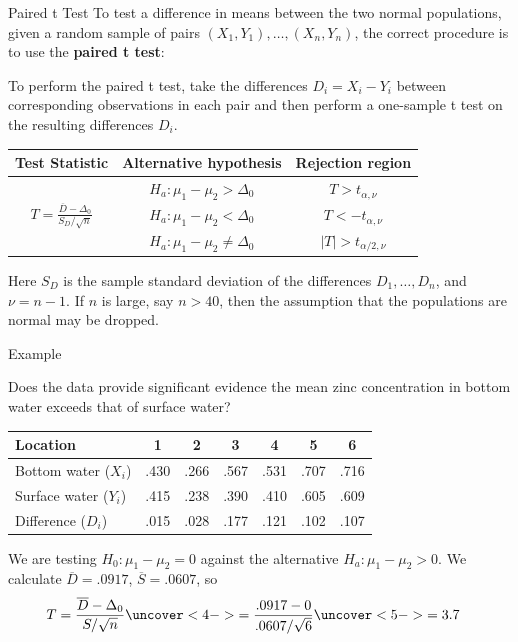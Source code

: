 \documentclass[handout]{beamer}
\renewcommand{\emph}{\textbf}
\begin{document}
\begin{frame}{Paired t Test}
To test a difference in means between the two normal populations, given a random sample of pairs $(X_1,Y_1), \dots, (X_n,Y_n)$, the correct procedure is to use the \emph{paired t test}:

\pause \vspace{.2cm}
To perform the paired t test, take the differences $D_i=X_i-Y_i$ between corresponding observations in each pair and then perform a one-sample t test on the resulting differences $D_i$.

\pause \begin{block}{}
\begin{tabular}{c|c|c}
Test Statistic & Alternative hypothesis & Rejection region \\ \hline
\multirow{3}{*}{$\displaystyle T=\frac{\overline D-\Delta_0}{S_D/\sqrt{n}}$} & $H_a: \mu_1-\mu_2>\Delta_0$ & $T>t_{\alpha,\nu}$ \\
& $H_a: \mu_1-\mu_2<\Delta_0$ & $T<-t_{\alpha,\nu}$ \\
& $H_a: \mu_1-\mu_2\neq\Delta_0$ & $|T|>t_{\alpha/2,\nu}$\\
\end{tabular}
\end{block}
\pause Here $S_D$ is the sample standard deviation of the differences $D_1,\dots,D_n$, and $\nu=n-1$. If $n$ is large, say $n>40$, then the assumption that the populations are normal may be dropped.

\end{frame}

\begin{frame}{Example}
\begin{block}{}
Does the data provide significant evidence the mean zinc concentration in bottom water exceeds that of surface water?
\end{block}

\begin{center}
\begin{tabular}{l|cccccc}
Location & 1 & 2 & 3 & 4 & 5 & 6 \\ \hline
Bottom water ($X_i$) &
.430 & .266 & .567 & .531 & .707 & .716 \\ \hline
Surface water ($Y_i$) &
.415 & .238 & .390 & .410 & .605 & .609 \\ \hline
Difference ($D_i$) &.015 & .028 & .177 & .121 & .102 & .107
\end{tabular}
\end{center}

\pause We are testing $H_0: \mu_1-\mu_2=0$ against the alternative $H_a: \mu_1-\mu_2>0$. \pause We calculate $\overline D = .0917$, $\overline S=.0607$, so
\begin{align*}
T&=\frac{\overline D-\Delta_0}{S/\sqrt{n}}
\uncover<4->{= \frac{.0917-0}{.0607/\sqrt{6}} }
\uncover<5->{=3.7}
\end{align*}
\end{frame}
\end{document}
